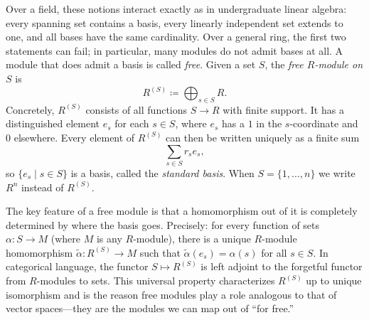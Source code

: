 \documentclass[Notebook.tex]{subfiles}
\begin{document}
    Over a field, these notions interact exactly as in undergraduate linear algebra: every spanning set contains a basis, every linearly independent set extends to one, and all bases have the same cardinality. Over a general ring, the first two statements can fail; in particular, many modules do not admit bases at all. A module that does admit a basis is called \emph{free}. Given a set $S$, the \emph{free $R$-module on $S$} is
    \[
    R^{(S)}\coloneqq \bigoplus_{s\in S}R.
    \]
    Concretely, $R^{(S)}$ consists of all functions $S\to R$ with finite support. It has a distinguished element $e_s$ for each $s\in S$, where $e_s$ has a $1$ in the $s$-coordinate and $0$ elsewhere. Every element of $R^{(S)}$ can then be written uniquely as a finite sum
    \[
    \sum_{s\in S}r_se_s,
    \]
    so $\{e_s\mid s\in S\}$ is a basis, called the \emph{standard basis}. When $S=\{1,\ldots,n\}$ we write $R^n$ instead of $R^{(S)}$.
    
    The key feature of a free module is that a homomorphism out of it is completely determined by where the basis goes. Precisely: for every function of sets $\alpha\colon S\to M$ (where $M$ is any $R$-module), there is a unique $R$-module homomorphism $\widetilde{\alpha}\colon R^{(S)}\to M$ such that $\widetilde{\alpha}(e_s)=\alpha(s)$ for all $s\in S$. In categorical language, the functor $S\mapsto R^{(S)}$ is left adjoint to the forgetful functor from $R$-modules to sets. This universal property characterizes $R^{(S)}$ up to unique isomorphism and is the reason free modules play a role analogous to that of vector spaces---they are the modules we can map out of ``for free.''

    \hrulefill
\end{document}
